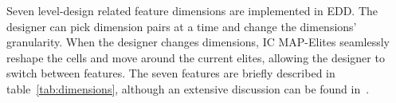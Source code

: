 
Seven level-design related feature dimensions are implemented in EDD. The designer can pick dimension pairs at a time and change the dimensions' granularity. When the designer changes dimensions, IC MAP-Elites seamlessly reshape the cells and move around the current elites, allowing the designer to switch between features. The seven features are briefly described in table~\ref{tab:dimensions}, although an extensive discussion can be found in~\cite{p9Alvarez2020-ICMAPE}. 





